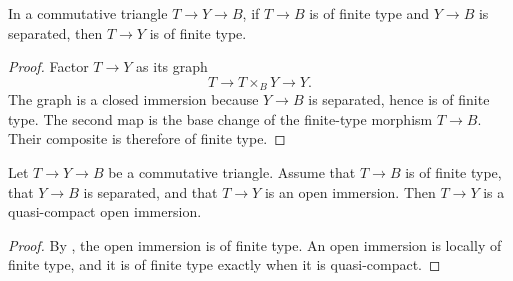 \begin{lemma}
  \label{lemma:nagata-finite-type-to-separated-target}
  \leanok

  In a commutative triangle \(T\to Y\to B\), if \(T\to B\) is of finite
  type and \(Y\to B\) is separated, then \(T\to Y\) is of finite type.
\end{lemma}

\begin{proof}
  \leanok
  Factor \(T\to Y\) as its graph
  \[
    T\longrightarrow T\times_BY\longrightarrow Y.
  \]
  The graph is a closed immersion because \(Y\to B\) is separated, hence is
  of finite type.  The second map is the base change of the finite-type
  morphism \(T\to B\).  Their composite is therefore of finite type.
\end{proof}

\begin{lemma}
  \label{lemma:nagata-open-immersion-qc-over-separated-target}
  \leanok

  Let \(T\to Y\to B\) be a commutative triangle.  Assume that \(T\to B\) is
  of finite type, that \(Y\to B\) is separated, and that \(T\to Y\) is an
  open immersion.  Then \(T\to Y\) is a quasi-compact open immersion.
\end{lemma}

\begin{proof}
  \leanok
  By , the open immersion
  is of finite type.  An open immersion is locally of finite type, and it is
  of finite type exactly when it is quasi-compact.
\end{proof}

